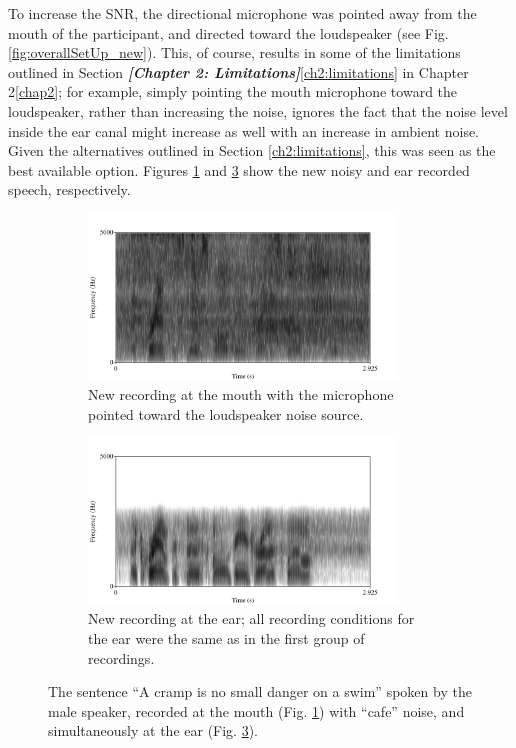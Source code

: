 \documentclass[dissertation,copyright]{uathesis}
\begin{document}
To increase the SNR, the directional microphone was pointed away from the mouth of the participant, and directed toward the loudspeaker (see Fig. \ref{fig:overallSetUp_new}).  This, of course, results in some of the limitations outlined in Section \textit{\textbf{[Chapter 2: Limitations]}}\ref{ch2:limitations} in Chapter 2\ref{chap2}; for example, simply pointing the mouth microphone toward the loudspeaker, rather than increasing the noise, ignores the fact that the noise level inside the ear canal might increase as well with an increase in ambient noise.  Given the alternatives outlined in Section \ref{ch2:limitations}, this was seen as the best available option.  Figures \ref{fig:spectNewMouthNoise} and \ref{fig:spectNewEarNoise} show the new noisy and ear recorded speech, respectively.
%
\begin{figure}
\begin{subfigure}{0.5\textwidth}
  \centering
  \includegraphics[width=0.9\textwidth]{figure/spectNewMouthNoise.png}
  \caption{New recording at the mouth with the microphone pointed toward the loudspeaker noise source.}
  \label{fig:spectNewMouthNoise}
\end{subfigure}
%
\begin{subfigure}{0.5\textwidth}
  \centering
  \includegraphics[width=0.9\textwidth]{figure/spectNewEarNoise.png}
  \caption{New recording at the ear; all recording conditions for the ear were the same as in the first group of recordings.}
  \label{fig:spectNewEarNoise}
\end{subfigure}
\caption{The sentence ``A cramp is no small danger on a swim'' spoken by the male speaker, recorded at the mouth (Fig. \ref{fig:spectNewMouthNoise}) with ``cafe'' noise, and simultaneously at the ear (Fig. \ref{fig:spectNewEarNoise}).}
\end{figure}
\end{document}
